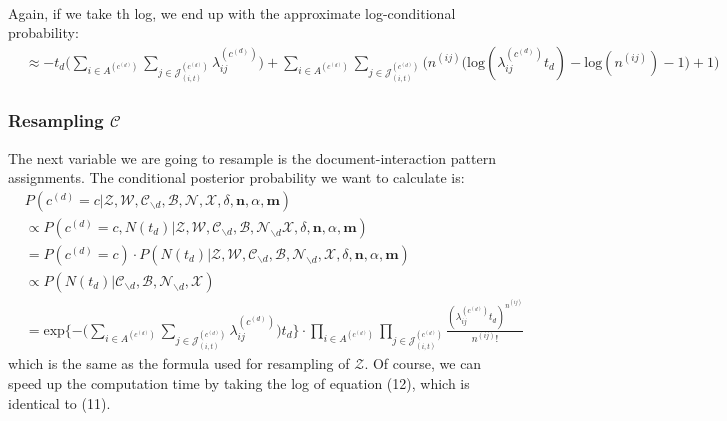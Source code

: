\documentclass[a4paper]{article}
\begin{document}
\begin{itemize}
\begin{equation}
\begin{aligned}
\end{aligned}
\end{equation}
Again, if we take th log, we end up with the approximate log-conditional probability:
				\begin{equation}
				\begin{aligned} 
				& \approx -t_d\big(\sum\limits_{i \in A^{(c^{(d)})}}\sum\limits_{j\in \mathcal{J}^{(c^{(d)})}_{(i, t)}}\lambda_{ij}^{(c^{(d)})}\big)+\sum_{i \in A^{(c^{(d)})}}\sum_{j\in \mathcal{J}^{(c^{(d)})}_{(i, t)}}\Big(n^{(ij)}\big(\mbox{log}(\lambda_{ij}^{(c^{(d)})}t_d)-\mbox{log}(n^{(ij)})-1\big)+1\Big) 
				\end{aligned}
				\end{equation}
\end{itemize}
 \subsubsection{Resampling $\mathcal{C}$}
 The next variable we are going to resample is the document-interaction pattern assignments. The conditional posterior probability we want to calculate is:
 \begin{equation}
 \begin{aligned} & P(c^{(d)}=c|\mathcal{Z}, \mathcal{W}, \mathcal{C}_{\backslash d}, \mathcal{B}, \mathcal{N}, \mathcal{X}, \delta, \boldsymbol{n}, \alpha, \boldsymbol{m})\\ &\propto  P(c^{(d)}=c, N{(t_d)}|\mathcal{Z}, \mathcal{W}, \mathcal{C}_{\backslash d}, \mathcal{B}, \mathcal{N}_{\backslash d}\mathcal{X}, \delta, \boldsymbol{n}, \alpha, \boldsymbol{m})\\ &= P(c^{(d)}=c)\cdot P( N{(t_d)} |\mathcal{Z}, \mathcal{W}, \mathcal{C}_{\backslash d}, \mathcal{B}, \mathcal{N}_{\backslash d}, \mathcal{X}, \delta, \boldsymbol{n}, \alpha, \boldsymbol{m})\\ &\propto P(N{(t_d)}| \mathcal{C}_{\backslash d}, \mathcal{B}, \mathcal{N}_{\backslash d}, \mathcal{X})\\ 
 & =
 \mbox{exp}\Big\{{-\big(\sum\limits_{i \in A^{(c^{(d)})}}\sum\limits_{j\in \mathcal{J}^{(c^{(d)})}_{(i, t)}}\lambda_{ij}^{(c^{(d)})}\big)t_d}\Big\}\cdot \prod_{i \in A^{(c^{(d)})}}\prod_{j\in \mathcal{J}^{(c^{(d)})}_{(i, t)}}\frac{(\lambda_{ij}^{(c^{(d)})}t_d)^{n^{(ij)}}}{n^{(ij)}!}
 \end{aligned}
 \end{equation}
 which is the same as the formula used for resampling of $\mathcal{Z}$. Of course, we can speed up the computation time by taking the log of equation (12), which is identical to (11).
\end{document}
